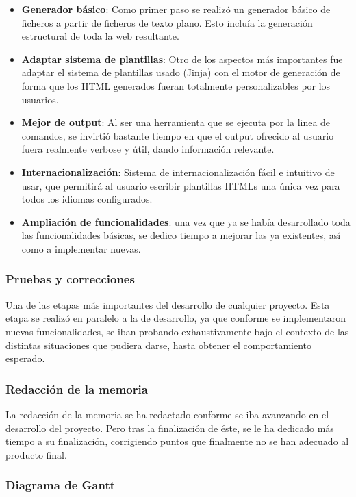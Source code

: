 \documentclass[a4paper,12pt]{article}
\begin{document}
\begin{itemize}
\item \textbf{Generador básico}: Como primer paso se realizó un generador básico de ficheros a partir
de ficheros de texto plano. Esto incluía la generación estructural de toda la web resultante.
\item \textbf{Adaptar sistema de plantillas}: Otro de los aspectos más importantes fue adaptar el sistema
de plantillas usado (Jinja) con el motor de generación de forma que los HTML generados fueran totalmente
personalizables por los usuarios.
\item \textbf{Mejor de output}: Al ser una herramienta que se ejecuta por la linea de comandos, se invirtió
bastante tiempo en que el output ofrecido al usuario fuera realmente verbose y útil, dando información relevante.
\item \textbf{Internacionalización}: Sistema de internacionalización fácil e intuitivo de usar, que permitirá al usuario
escribir plantillas HTMLs una única vez para todos los idiomas configurados.
\item \textbf{Ampliación de funcionalidades}: una vez que ya se había desarrollado toda las funcionalidades básicas,
se dedico tiempo a mejorar las ya existentes, así como a implementar nuevas.
\end{itemize}


\subsubsection{Pruebas y correcciones}

Una de las etapas más importantes del desarrollo de cualquier proyecto. Esta etapa se realizó en paralelo
a la de desarrollo, ya que conforme se implementaron nuevas funcionalidades, se iban probando exhaustivamente
bajo el contexto de las distintas situaciones que pudiera darse, hasta obtener el comportamiento
esperado.

\subsubsection{Redacción de la memoria}

La redacción de la memoria se ha redactado conforme se iba avanzando en el desarrollo del proyecto.
Pero tras la finalización de éste, se le ha dedicado más tiempo a su finalización, corrigiendo puntos que
finalmente no se han adecuado al producto final.

\subsubsection{Diagrama de Gantt}
\end{document}
